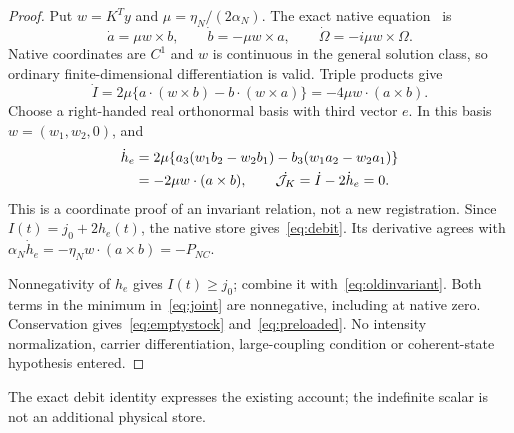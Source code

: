 \begin{proof}
Put $w=K^Ty$ and $\mu=\eta_N/(2\alpha_N)$. The exact native equation~\cite[Proposition 2.1]{p1} is
\begin{equation}\label{eq:core}%
\dot a=\mu w\times b,\qquad
\dot b=-\mu w\times a,\qquad
\dot\Omega=-i\mu w\times\Omega.
\end{equation}
Native coordinates are $C^1$ and $w$ is continuous in the general solution class, so ordinary finite-dimensional differentiation is valid. Triple products give
\begin{equation}\label{eq:Idot}%
\dot I=2\mu\{a\cdot(w\times b)-b\cdot(w\times a)\}
=-4\mu w\cdot(a\times b).
\end{equation}
Choose a right-handed real orthonormal basis with third vector $e$. In this basis $w=(w_1,w_2,0)$, and
\begin{equation}\label{eq:hdot}%
\begin{aligned}
\dot h_e
&=2\mu\{a_3(w_1b_2-w_2b_1)-b_3(w_1a_2-w_2a_1)\}\\
&=-2\mu w\cdot(a\times b),\qquad
\dot\Jk=\dot I-2\dot h_e=0.
\end{aligned}
\end{equation}
This is a coordinate proof of an invariant relation, not a new registration.
Since $I(t)=j_0+2h_e(t)$, the native store gives~\eqref{eq:debit}. Its derivative agrees with $\alpha_N\dot h_e=-\eta_Nw\cdot(a\times b)=-P_{NC}$.

Nonnegativity of $h_e$ gives $I(t)\ge j_0$; combine it with~\eqref{eq:oldinvariant}. Both terms in the minimum in~\eqref{eq:joint} are nonnegative, including at native zero. Conservation gives~\eqref{eq:emptystock} and~\eqref{eq:preloaded}. No intensity normalization, carrier differentiation, large-coupling condition or coherent-state hypothesis entered.
\end{proof}
The exact debit identity expresses the existing account; the indefinite scalar is not an additional physical store.

